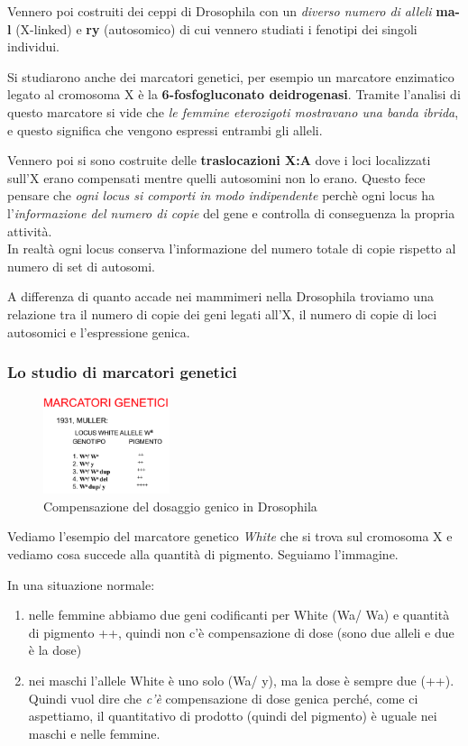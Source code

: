 \documentclass[11pt]{book}
\begin{document}
Vennero poi costruiti dei ceppi di Drosophila con un \emph{diverso numero di alleli} \textbf{ma-l} (X-linked) e \textbf{ry} (autosomico) di cui vennero studiati i fenotipi dei singoli individui.

Si studiarono anche dei marcatori genetici, per esempio un marcatore enzimatico legato al cromosoma X è la \textbf{6-fosfogluconato deidrogenasi}. Tramite l'analisi di questo marcatore si vide che \emph{le femmine eterozigoti mostravano una banda ibrida}, e questo significa che vengono espressi entrambi gli alleli.

Vennero poi si sono costruite delle \textbf{traslocazioni X:A} dove i loci localizzati sull'X erano compensati mentre quelli autosomini non lo erano. Questo fece pensare che \emph{ogni locus si comporti in modo indipendente} perchè ogni locus ha l'\emph{informazione del numero di copie} del gene e controlla di conseguenza la propria attività.\\
In realtà ogni locus conserva l’informazione del numero totale di copie rispetto al numero di set di autosomi.

A differenza di quanto accade nei mammimeri nella Drosophila troviamo una relazione tra il numero di copie dei geni legati all'X, il numero di copie di loci autosomici e l'espressione genica.

\subsubsection{Lo studio di marcatori genetici}

\begin{figure}
    \includegraphics[width=0.33\textwidth]{img/marcatori_genetici.png}
  \caption{Compensazione del dosaggio genico in Drosophila}
\end{figure}

Vediamo l’esempio del marcatore genetico \emph{White} che si trova sul cromosoma X e vediamo cosa succede alla quantità di pigmento.
Seguiamo l’immagine.

In una situazione normale:
\begin{enumerate}
\item nelle femmine abbiamo due geni codificanti per White (Wa/ Wa) e quantità di pigmento ++, quindi non c’è compensazione di dose (sono due alleli e due è la dose)
\item nei maschi l’allele White è uno solo (Wa/ y), ma la dose è sempre due (++). Quindi vuol dire che \emph{c’è} compensazione di dose genica perché, come ci aspettiamo, il quantitativo di prodotto (quindi del pigmento) è uguale nei maschi e nelle femmine.
\end{enumerate}
\end{document}
